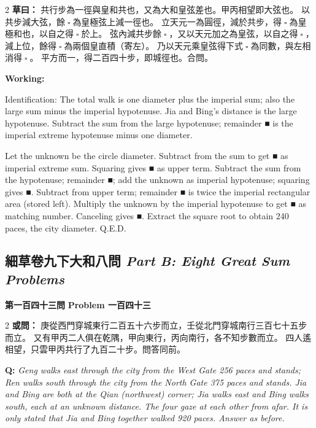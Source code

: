 \documentclass[11pt,a4paper]{article}
\let\origsquare\square
\renewcommand{\square}{\ensuremath{\origsquare}}%
\newcommand{\wen}[1]{%
  \par\vspace{0.5em}%
  \noindent\textcolor{problemcolor}{\textbf{第#1問}}%
  \hfill\textcolor{problemcolor}{\textbf{Problem #1}}\par\nopagebreak%
  \vspace{0.3em}%
}
\newcommand{\owen}[1]{%
  \noindent\textcolor{problemcolor}{\textbf{或問：}}{\tradfont #1}\par\nopagebreak%
}
\newcommand{\oweneng}[1]{%
  \noindent\textcolor{engcolor}{\textbf{Q: }}{\itshape #1}\par\nopagebreak%
}
\newcommand{\tsaoyue}[1]{%
  \noindent\textcolor{workcolor}{\textbf{草曰：}}{\tradfont #1}\par%
}
\newcommand{\tsaoyueeng}[1]{%
  \noindent\textcolor{engcolor}{\textbf{Working: }}{\small #1}\par%
}
\newcommand{\bilingsubsec}[2]{%
  \subsection{\tradfont #1 \hfill\normalfont\normalsize\textit{#2}}%
}
\begin{document}
\begin{paracol}{2}
\tsaoyue{%
共行步為一徑與皇和共也，又為大和皇弦差也。甲丙相望即大弦也。
以共步減大弦，餘$ \; \square \; $為皇極弦上減一徑也。
立天元一為圓徑，減於共步，得$ \; \square \; $為皇極和也，以自之得$ \; \square \; $於上。
弦內減共步餘$ \; \square \; $，又以天元加之為皇弦，以自之得$ \; \square \; $，
減上位，餘得$ \; \square \; $為兩個皇直積（寄左）。
乃以天元乘皇弦得下式$ \; \square \; $為同數，與左相消得$ \; \square \; $。
平方而一，得二百四十步，即城徑也。合問。}
\switchcolumn
\tsaoyueeng{%
Identification: The total walk is one diameter plus the imperial sum; also the large sum minus the imperial hypotenuse. Jia and Bing's distance is the large hypotenuse. Subtract the sum from the large hypotenuse; remainder ■ is the imperial extreme hypotenuse minus one diameter.

Let the unknown be the circle diameter. Subtract from the sum to get ■ as imperial extreme sum. Squaring gives ■ as upper term. Subtract the sum from the hypotenuse; remainder ■; add the unknown as imperial hypotenuse; squaring gives ■. Subtract from upper term; remainder ■ is twice the imperial rectangular area (stored left). Multiply the unknown by the imperial hypotenuse to get ■ as matching number. Canceling gives ■. Extract the square root to obtain 240 paces, the city diameter. Q.E.D.}
\end{paracol}

\vspace{0.5cm}

\newpage
\bilingsubsec{細草卷九下\quad 大和八問}{Part B: Eight Great Sum Problems}

\vspace{0.3cm}

\wen{一百四十三}

\begin{paracol}{2}
\owen{%
庚從西門穿城東行二百五十六步而立，壬從北門穿城南行三百七十五步而立。
又有甲丙二人俱在乾隅，甲向東行，丙向南行，各不知步數而立。
四人遙相望，只雲甲丙共行了九百二十步。問答同前。}
\switchcolumn
\oweneng{%
Geng walks east through the city from the West Gate 256 paces and stands; Ren walks south through the city from the North Gate 375 paces and stands. Jia and Bing are both at the Qian (northwest) corner; Jia walks east and Bing walks south, each at an unknown distance. The four gaze at each other from afar. It is only stated that Jia and Bing together walked 920 paces. Answer as before.}
\end{paracol}
\end{document}
